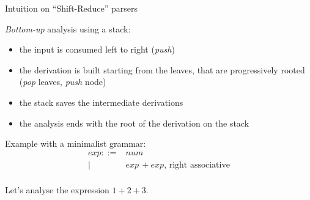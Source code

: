 \documentclass[aspectratio=169]{beamer}          %
\begin{document}
\begin{frame}{Intuition on ``Shift-Reduce'' parsers}

  {\em Bottom-up} analysis using a stack:

  \begin{itemize}
    \item the input is consumed left to right ({\em push})
    \item the derivation is built starting from the leaves,
          that are progressively rooted ({\em pop} leaves, {\em push} node)
    \item the stack saves the intermediate derivations
    \item the analysis ends with the root of the derivation on the stack
  \end{itemize}

  \pause

  Example with a minimalist grammar:
  $$
  \begin{array}{rl}
    exp ::= & num \\
          | & exp\,+ exp \text{, right associative}\\
  \end{array}
  $$

  Let's analyse the expression $1+2+3$.
\end{frame}
\end{document}
